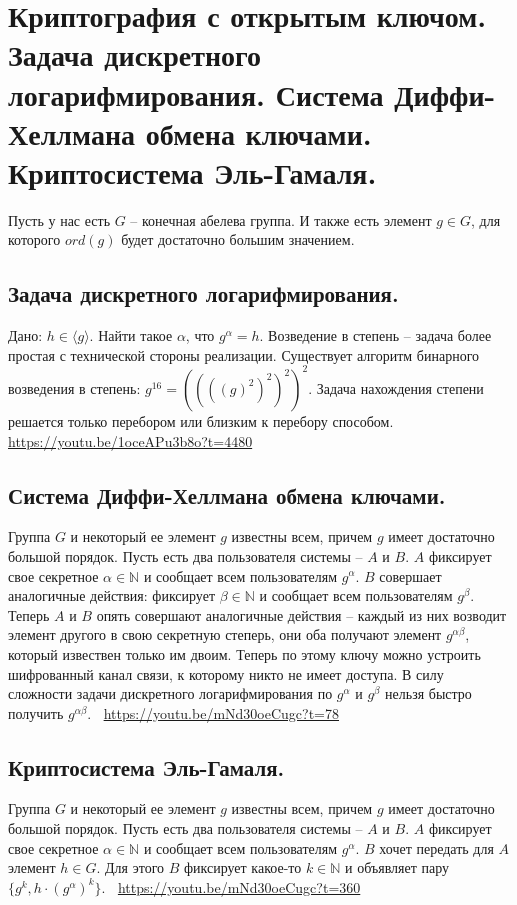 \section{Криптография с открытым ключом. Задача дискретного логарифмирования. Система Диффи-Хеллмана обмена ключами. Криптосистема Эль-Гамаля.}

Пусть у нас есть $G$ -- конечная абелева группа. И также есть элемент $g \in G$, для которого $ord(g)$ будет достаточно большим значением.

\subsection{Задача дискретного логарифмирования.}
Дано: $h \in \langle g \rangle$. Найти такое $\alpha$, что $g^{\alpha} = h$.
Возведение в степень -- задача более простая с технической стороны реализации. Существует алгоритм бинарного возведения в степень: $g^{16} = ((((g)^2)^2)^2)^2$. Задача нахождения степени решается только перебором или близким к перебору способом.
\newline
\newline
\large \faYoutube \normalsize $\>$ \url{https://youtu.be/1oceAPu3b8o?t=4480}

\subsection{Система Диффи-Хеллмана обмена ключами.}
Группа $G$ и  некоторый ее элемент $g$ известны всем, причем $g$ имеет достаточно большой порядок.
Пусть есть два пользователя системы -- $A$ и $B$. $A$ фиксирует свое секретное $\alpha \in \mathbb{N}$ и сообщает всем пользователям $g^{\alpha}$. $B$ совершает аналогичные действия: фиксирует $\beta \in \mathbb{N}$ и сообщает всем пользователям $g^{\beta}$. Теперь $A$ и $B$ опять совершают аналогичные действия -- каждый из них возводит элемент другого в свою секретную степерь, они оба получают элемент $g^{\alpha \beta}$, который извествен только им двоим. Теперь по этому ключу можно устроить шифрованный канал связи, к которому никто не имеет доступа. В силу сложности задачи дискретного логарифмирования по $g^{\alpha}$ и $g^{\beta}$ нельзя быстро получить $g^{\alpha \beta}$.
\newline
\newline
\large \faYoutube \normalsize $\>$ \url{https://youtu.be/mNd30oeCugc?t=78}

\subsection{Криптосистема Эль-Гамаля.}
Группа $G$ и  некоторый ее элемент $g$ известны всем, причем $g$ имеет достаточно большой порядок. Пусть есть два пользователя системы -- $A$ и $B$. $A$ фиксирует свое секретное $\alpha \in \mathbb{N}$ и сообщает всем пользователям $g^{\alpha}$. $B$ хочет передать для $A$ элемент $h \in G$. Для этого $B$ фиксирует какое-то $k \in \mathbb{N}$ и объявляет пару $\{ g^k, h \cdot (g^{\alpha})^k \}$. 
\newline
\newline
\large \faYoutube \normalsize $\>$ \url{https://youtu.be/mNd30oeCugc?t=360}